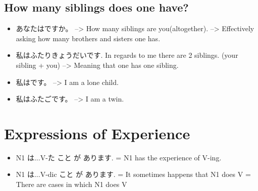 \documentclass{article}
\begin{document}
\subsection*{How many siblings does one have?}
\begin{itemize}
\item あなたはですか。 --> How many siblings are you(altogether). --> Effectively asking how many brothers and sisters one has.
\item 私はふたりきょうだいです. In regards to me there are 2 siblings. (your sibling + you) --> Meaning that one has \color{red}one \color{black}sibling.
\item 私はです。 --> I am a lone child.
\item 私はふたごです。 --> I am a twin.
\end{itemize}
\section{Expressions of Experience}
\begin{itemize}
    \item N1 は...V-た  こと が あります. = N1 has the experience of V-ing.
    \item N1 は...V-dic こと が あります. = It sometimes happens that N1 does V
                                     = There are cases in which N1 does V
\end{itemize}
\end{document}

